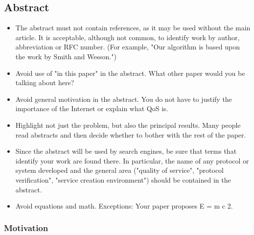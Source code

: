 \subsection*{Abstract}
\begin{itemize}
    \color{red}
    \item The abstract must not contain references, as it may be used without the main article. It is acceptable, although not common, to identify work by author, abbreviation or RFC number. (For example, "Our algorithm is based upon the work by Smith and Wesson.")
    \item Avoid use of "in this paper" in the abstract. What other paper would you be talking about here?
    \item Avoid general motivation in the abstract. You do not have to justify the importance of the Internet or explain what QoS is.
    \item Highlight not just the problem, but also the principal results. Many people read abstracts and then decide whether to bother with the rest of the paper.
    \item Since the abstract will be used by search engines, be sure that terms that identify your work are found there. In particular, the name of any protocol or system developed and the general area ("quality of service", "protocol verification", "service creation environment") should be contained in the abstract.
    \item Avoid equations and math. Exceptions: Your paper proposes E = m c 2.
\end{itemize}

\subsubsection*{Motivation}


